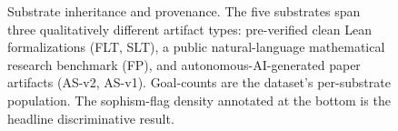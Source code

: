\begin{figure}[t]
\caption{Substrate inheritance and provenance. The five substrates span three
qualitatively different artifact types: pre-verified clean Lean
formalizations (FLT, SLT), a public natural-language mathematical research
benchmark (FP), and autonomous-AI-generated paper artifacts (AS-v2, AS-v1).
Goal-counts are the dataset's per-substrate population. The sophism-flag
density annotated at the bottom is the headline discriminative result.}
\label{fig:substrate_inheritance}
\end{figure}
